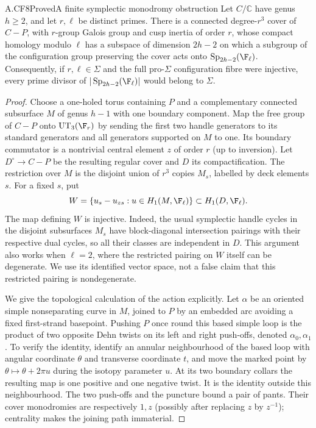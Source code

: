 \begin{claim}{A.CF8}{Proved}{A finite symplectic monodromy obstruction}
Let $C/\mathbb C$ have genus $h\geq2$, and let $r,\ell$ be distinct
primes. There is a connected degree-$r^3$ cover of $C-P$, with
$r$-group Galois group and cusp inertia of order $r$, whose compact
homology modulo $\ell$ has a subspace of dimension $2h-2$ on which
a subgroup of the configuration group preserving the cover acts
onto $\operatorname{Sp}_{2h-2}(\F_\ell)$. Consequently, if $r,\ell\in\Sigma$
and the full pro-$\Sigma$ configuration fibre were injective, every
prime divisor of $|\operatorname{Sp}_{2h-2}(\F_\ell)|$ would belong
to $\Sigma$.
\end{claim}
\begin{proof}
Choose a one-holed torus containing $P$ and a complementary connected
subsurface $M$ of genus $h-1$ with one boundary component. Map the
free group of $C-P$ onto $\operatorname{UT}_3(\F_r)$ by sending
the first two handle generators to its standard generators and all
generators supported on $M$ to one. Its boundary commutator is a
nontrivial central element $z$ of order $r$ (up to inversion).
Let $D^\circ\to C-P$ be the resulting regular cover and $D$ its
compactification. The restriction over $M$ is the disjoint union of
$r^3$ copies $M_s$, labelled by deck elements $s$. For a fixed $s$,
put
\[
 W=\{u_s-u_{zs}:u\in H_1(M,\F_\ell)\}\subset H_1(D,\F_\ell).
\]
The map defining $W$ is injective. Indeed, the usual symplectic handle
cycles in the disjoint subsurfaces $M_s$ have block-diagonal
intersection pairings with their respective dual cycles, so all their
classes are independent in $D$. This argument also works when
$\ell=2$, where the restricted pairing on $W$ itself can be
 degenerate. We use its identified vector space, not a false claim
that this restricted pairing is nondegenerate.

We give the topological calculation of the action explicitly. Let
$\alpha$ be an oriented simple nonseparating curve in $M$, joined to
$P$ by an embedded arc avoiding a fixed first-strand basepoint.
Pushing $P$ once round this based simple loop is the product of two
opposite Dehn twists on its left and right push-offs, denoted
$\alpha_0,\alpha_1$. To verify the identity, identify an annular
neighbourhood of the based loop with angular coordinate $\theta$ and
transverse coordinate $t$, and move the marked point by
$\theta\mapsto\theta+2\pi u$ during the isotopy parameter $u$.
At its two boundary collars the resulting map is one positive and
one negative twist. It is the identity outside this neighbourhood.
The two push-offs and the puncture bound a pair of pants. Their
cover monodromies are respectively $1,z$ (possibly after replacing
$z$ by $z^{-1}$); centrality makes the joining path immaterial.


\end{proof}
